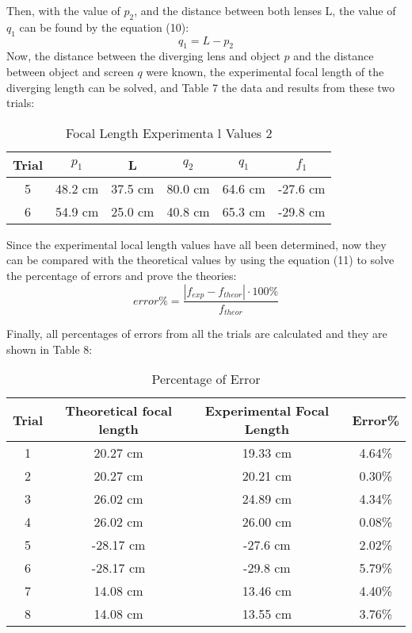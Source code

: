 \documentclass[12pt]{article}
\begin{document}
Then, with the value of ${p}_{2}$, and the distance between both lenses L, the value of ${q}_{1}$ can be found by
the equation (10):
\begin{equation}
{q}_{1} = L - {p}_{2}
\end{equation}
Now, the distance between the diverging lens and object $p$ and the distance between object and screen $q$ were known, the experimental focal length of the diverging length can be solved, and Table 7 the data and results from these two trials:
\begin{table}[H]
\caption{Focal Length Experimenta l Values 2}
\centering
\begin{tabular}[width=05\linewidth]{cccccc}
     
Trial &${p}_{1}$&L &${q}_{2}$ &${q}_{1}$ &${f}_{1}$\\
\hline
5 &48.2 cm &37.5 cm &80.0 cm &64.6 cm&-27.6 cm\\
6 &54.9 cm &25.0 cm &40.8 cm &65.3 cm&-29.8 cm\\
      \hline
      \end{tabular}
\end{table}
Since the experimental local length values have all been determined, now they can be compared with the theoretical values by using the equation (11) to solve the percentage of errors and prove the theories:
\begin{equation}
	error \% = \frac{|{f}_{exp} - {f}_{theor}| \cdot 100 \%}{{f}_{theor}}
	\end{equation} 

Finally, all percentages of errors from all the trials are calculated and they are shown in Table 8:

\begin{table}[H]
\caption{Percentage of Error}
\centering
\begin{tabular}[width=05\linewidth]{cccc}
     
Trial &Theoretical focal length &Experimental Focal Length &Error\% \\
\hline
1 &20.27 cm &19.33 cm &4.64\% \\
2 &20.27 cm &20.21 cm &0.30\%\\
3 &26.02 cm &24.89 cm &4.34\% \\
4 &26.02 cm &26.00 cm &0.08\% \\
5 &-28.17 cm &-27.6 cm &2.02\% \\
6 &-28.17 cm &-29.8 cm &5.79\% \\
7 &14.08 cm &13.46 cm &4.40\% \\
8 &14.08 cm &13.55 cm &3.76\% \\
      \hline
      \end{tabular}
\end{table}
\end{document}

